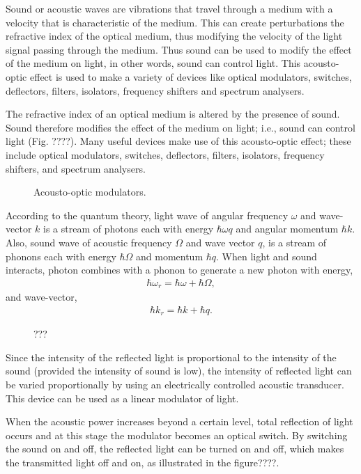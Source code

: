 Sound or acoustic waves are vibrations that travel through a medium with a velocity that is characteristic of the medium. This can create perturbations the refractive index of the optical medium, thus modifying the velocity of the light signal passing through the medium. Thus sound can be used to modify the effect of the medium on light, in other words, sound can control light. This acousto-optic effect is used to make a variety of devices like optical modulators, switches, deflectors, filters, isolators, frequency shifters and spectrum analysers.
 
The refractive index of an optical medium is altered by the presence of sound. Sound therefore modifies the effect of the medium on light; i.e., sound can control light (Fig. ????). Many useful devices make use of this acousto-optic effect; these include optical modulators, switches, deflectors, filters, isolators, frequency shifters, and spectrum analysers. 

\begin{figure}[!htbp]
\caption{Acousto-optic modulators.}
\end{figure}

According to the quantum theory, light wave of angular frequency $\omega$ and wave-vector $k$ is a stream of photons each with energy $\hbar\omega q$ and angular momentum $\hbar k$. Also, sound wave of acoustic frequency $\Omega$ and wave vector $q$, is a stream of phonons each with energy $\hbar\Omega$ and momentum $\hbar q$. When light and sound interacts, photon combines with a phonon to generate a new photon with energy, 
\begin{align}
\hbar\omega_r = \hbar\omega + \hbar\Omega,
\end{align}
and wave-vector,
\begin{align}
\hbar k_r = \hbar k + \hbar q.
\end{align}

\begin{figure}[!htbp]
\caption{???}
\end{figure}

Since the intensity of the reflected light is proportional to the intensity of the sound (provided the intensity of sound is low), the intensity of reflected light can be varied proportionally by using an electrically controlled acoustic transducer. This device can be used as a linear modulator of light.

When the acoustic power increases beyond a certain level, total reflection of light occurs and at this stage the modulator becomes an optical switch. By switching the sound on and off, the reflected light can be turned on and off, which makes the transmitted light off and on, as illustrated in the figure????.

